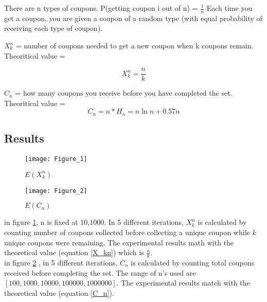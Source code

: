\documentclass{homeworg}
\let\Oldsubsection\subsection
\renewcommand{\subsection}{\FloatBarrier\Oldsubsection}
\begin{document}
\newpage
\exercise
\newpage
\exercise
There are n types of coupons.
P(getting coupon i out of n) = $\frac{1}{n}$
Each time you get a coupon, you are given a coupon of a random type (with equal probability of receiving each type of coupon).

$X_k^n$ = number of coupons needed to get a new coupon when k coupons remain. \\
Theoritical value = 

\begin{equation}
\label{X_kn}
X_k^n = \frac{n}{k}
\end{equation}

$C_n$ = how many coupons you receive before you have completed the set. \\ 
Theoritical value = 
\begin{equation}
\label{C_n}
C_n = n \ast H_n = n \ln n +0.57n    
\end{equation}

\subsection{Results}
\begin{figure}[h]
    \centering
    \texttt{[image: Figure\_1]}
    \caption{$E(X_k^n)$}
    \label{fig:X_kn}
\end{figure}



\begin{figure}[h]
    \centering
    \texttt{[image: Figure\_2]}
    \caption{$E(C_n)$}
    \label{fig:C_n}
\end{figure}

in figure \ref{fig:X_kn}, n is fixed at 10,1000. In 5 different iterations, $X_k^n$ is calculated by counting number of coupons collected before collecting a unique coupon while $k$ unique coupons were remaining. The experimental results math with the theoretical value (equation \ref{X_kn}) which is $\frac{n}{k}$.\\

in figure \ref{fig:C_n} , in 5 different iterations, $C_n$ is calculated by counting total coupons received before completing the set. The range of n's used are $[100, 1000, 10000, 100000, 1000000]$. The experimental results match with the theoretical value (equation \ref{C_n}).
\end{document}
